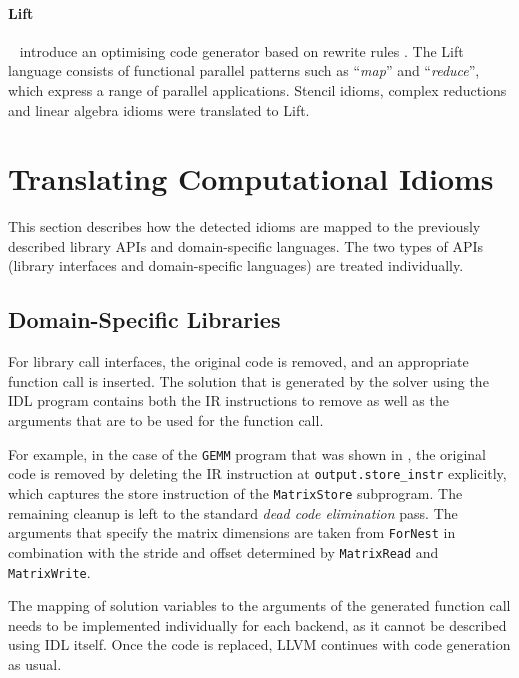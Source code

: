     \paragraph*{Lift}~\citet{steuwer15rewrite} introduce an optimising code
    generator based on rewrite rules \citep{SteuwerRD17, HagedornSSGD18}.
    The Lift language consists of functional parallel patterns such as
    ``\emph{map}'' and ``\emph{reduce}'', which  express a range of parallel
    applications.
    Stencil idioms, complex reductions and linear algebra idioms were translated
    to Lift.

\section{Translating Computational Idioms}

    This section describes how the detected idioms are mapped to the previously
    described library APIs and domain-specific languages.
    The two types of APIs (library interfaces and domain-specific languages) are
    treated individually.

\subsection{Domain-Specific Libraries}

    For library call interfaces, the original code is removed, and an
    appropriate function call is inserted.
    The solution that is generated by the solver using the IDL program contains
    both the IR instructions to remove as well as the arguments that are to be
    used for the function call.

    For example, in the case of the {\tt GEMM} program that was shown in
    , the original code is removed by deleting the IR
    instruction at {\tt output.store\_instr} explicitly, which captures the
    store instruction of the {\tt MatrixStore} subprogram.
    The remaining cleanup is left to the standard {\em dead code elimination}
    pass.
    The arguments that specify the matrix dimensions are taken from
    {\tt ForNest} in combination with the stride and offset determined by
    {\tt MatrixRead} and {\tt MatrixWrite}.

    The mapping of solution variables to the arguments of the generated function
    call needs to be implemented individually for each backend, as it cannot be
    described using IDL itself.
    Once the code is replaced, LLVM continues with code generation as usual.

